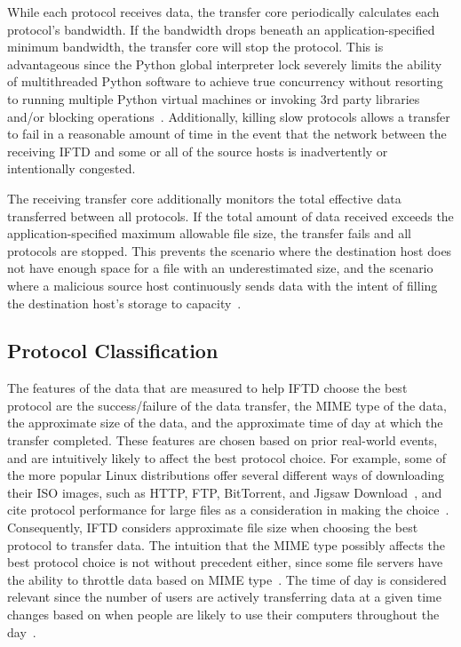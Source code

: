 While each protocol receives data, the transfer core periodically calculates each protocol's bandwidth.  If the bandwidth drops beneath an application-specified minimum bandwidth, the transfer core will stop the protocol.  This is advantageous since the Python global interpreter lock severely limits the ability of multithreaded Python software to achieve true concurrency without resorting to running multiple Python virtual machines or invoking 3rd party libraries and/or blocking operations~\cite{python_gil}.  Additionally, killing slow protocols allows a transfer to fail in a reasonable amount of time in the event that the network between the receiving IFTD and some or all of the source hosts is inadvertently or intentionally congested.

The receiving transfer core additionally monitors the total effective data transferred between all protocols.  If the total amount of data received exceeds the application-specified maximum allowable file size, the transfer fails and all protocols are stopped.  This prevents the scenario where the destination host does not have enough space for a file with an underestimated size, and the scenario where a malicious source host continuously sends data with the intent of filling the destination host's storage to capacity~\cite{cappos_security_paper}.

\subsection{Protocol Classification}

The features of the data that are measured to help IFTD choose the best protocol are the success/failure of the data transfer, the MIME type of the data, the approximate size of the data, and the approximate time of day at which the transfer completed.  These features are chosen based on prior real-world events, and are intuitively likely to affect the best protocol choice.  For example, some of the more popular Linux distributions offer several different ways of downloading their ISO images, such as HTTP, FTP, BitTorrent, and Jigsaw Download~\cite{jigdo}, and cite protocol performance for large files as a consideration in making the choice~\cite{debian,fedora,ubuntu}.  Consequently, IFTD considers approximate file size when choosing the best protocol to transfer data.  The intuition that the MIME type possibly affects the best protocol choice is not without precedent either, since some file servers have the ability to throttle data based on MIME type~\cite{microsoft_iis_throttling}.  The time of day is considered relevant since the number of users are actively transferring data at a given time changes based on when people are likely to use their computers throughout the day~\cite{cisco_vni_study}.


